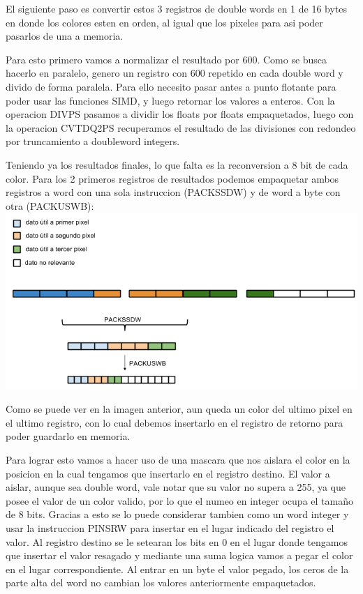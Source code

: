 El siguiente paso es convertir estos 3 registros de double words en 1 de 16 bytes en donde los colores esten en orden, al igual que los pixeles para asi poder pasarlos de una a memoria.

Para esto primero vamos a normalizar el resultado por 600. Como se busca hacerlo en paralelo, genero un registro con 600 repetido en cada double word y divido de forma paralela. Para ello necesito pasar antes a punto flotante para poder usar las funciones SIMD, y luego retornar los valores a enteros. Con la operacion DIVPS pasamos a dividir los floats por floats empaquetados, luego con la operacion CVTDQ2PS recuperamos el resultado de las divisiones con redondeo por truncamiento a doubleword integers.


Teniendo ya los resultados finales, lo que falta es la reconversion a 8 bit de cada color.
Para los 2 primeros registros de resultados podemos empaquetar ambos registros a word con una sola instruccion (PACKSSDW) y de word a byte con otra (PACKUSWB):\\

\includegraphics[scale=0.5]{imagenes/empaquetamiento.png}

Como se puede ver en la imagen anterior, aun queda un color del ultimo pixel en el ultimo registro, con lo cual debemos insertarlo en el registro de retorno para poder guardarlo en memoria.

Para lograr esto vamos a hacer uso de una mascara que nos aislara el color en la posicion en la cual tengamos que insertarlo en el registro destino. El valor a aislar, aunque sea double word, vale notar que su valor no supera a 255, ya que posee el valor de un color valido, por lo que el numeo en integer ocupa el tamaño de 8 bits. Gracias a esto se lo puede considerar tambien como un word integer y usar la instruccion PINSRW para insertar en el lugar indicado del registro el valor. Al registro destino se le setearan los bits en 0 en el lugar donde tengamos que insertar el valor resagado y mediante una suma logica vamos a pegar el color en el lugar correspondiente. Al entrar en un byte el valor pegado, los ceros de la parte alta del word no cambian los valores anteriormente empaquetados.\\

